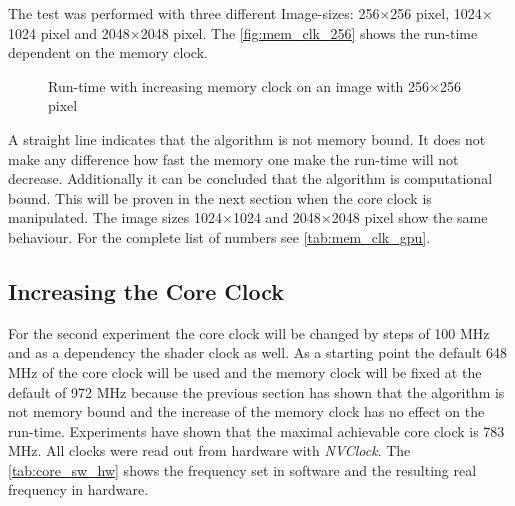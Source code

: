 The test was performed with three different Image-sizes: 256$\times$256 pixel, 
1024$\times$1024 pixel and 2048$\times$2048 pixel. The \autoref{fig:mem_clk_256}
shows the run-time dependent on the memory clock.

\begin{figure}[ht]
  \centering


  \tableA

 \label{fig:mem_clk_256}%
 \caption{Run-time with increasing memory clock on an image with 256$\times$256 pixel}
\end{figure}

A straight line indicates that the algorithm is not memory bound. It does not
make any difference how fast the memory one make the run-time will not decrease. 
Additionally it can be concluded that the algorithm is computational bound. This
will be proven in the next section when the core clock is manipulated. The image
sizes 1024$\times$1024 and 2048$\times$2048 pixel show the same behaviour. For 
the complete list of numbers see \autoref{tab:mem_clk_gpu}.


\subsection{Increasing the Core Clock} %
\label{sub:increasing_the_core_clock}
For the second experiment the core clock will be changed by steps of 100
\gls{MHz} and as a dependency the shader clock as well. As a starting point the
default 648 \gls{MHz} of the core clock will be used and the memory clock will
be fixed at the default of 972 \gls{MHz} because the previous section has shown
that the algorithm is not memory bound and the increase of the memory clock has
no effect on the run-time. Experiments have shown that the maximal achievable
core clock is 783 \gls{MHz}. All clocks were read out from hardware with
\emph{NVClock}. The \autoref{tab:core_sw_hw} shows the frequency set in software
and the resulting real frequency in hardware.

